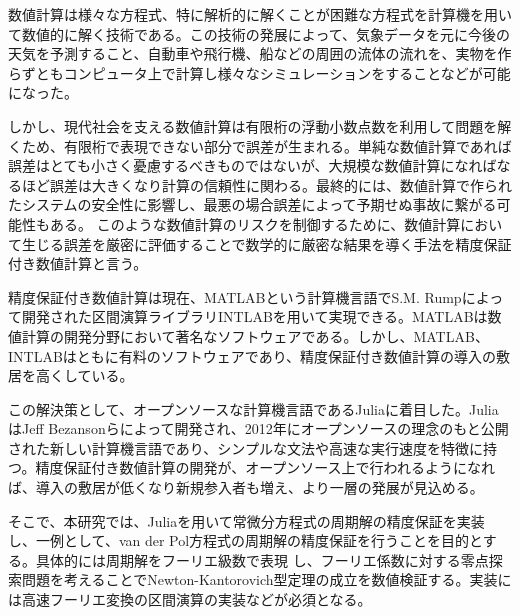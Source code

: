 %
数値計算は様々な方程式、特に解析的に解くことが困難な方程式を計算機を用いて数値的に解く技術である。この技術の発展によって、気象データを元に今後の天気を予測すること、自動車や飛行機、船などの周囲の流体の流れを、実物を作らずともコンピュータ上で計算し様々なシミュレーションをすることなどが可能になった。

しかし、現代社会を支える数値計算は有限桁の浮動小数点数を利用して問題を解くため、有限桁で表現できない部分で誤差が生まれる。単純な数値計算であれば誤差はとても小さく憂慮するべきものではないが、大規模な数値計算になればなるほど誤差は大きくなり計算の信頼性に関わる。最終的には、数値計算で作られたシステムの安全性に影響し、最悪の場合誤差によって予期せぬ事故に繋がる可能性もある。
このような数値計算のリスクを制御するために、数値計算において生じる誤差を厳密に評価することで数学的に厳密な結果を導く手法を精度保証付き数値計算と言う\cite{seidohoshou}。

精度保証付き数値計算は現在、MATLABという計算機言語でS.M. Rumpによって開発された区間演算ライブラリINTLABを用いて実現できる。MATLABは数値計算の開発分野において著名なソフトウェアである。しかし、MATLAB、INTLABはともに有料のソフトウェアであり、精度保証付き数値計算の導入の敷居を高くしている。

この解決策として、オープンソースな計算機言語であるJuliaに着目した。JuliaはJeff Bezansonらによって開発され、2012年にオープンソースの理念のもと公開された新しい計算機言語であり、シンプルな文法や高速な実行速度を特徴に持つ。精度保証付き数値計算の開発が、オープンソース上で行われるようになれば、導入の敷居が低くなり新規参入者も増え、より一層の発展が見込める。

そこで、本研究では、Juliaを用いて常微分方程式の周期解の精度保証を実装し、一例として、van der Pol方程式の周期解の精度保証を行うことを目的とする。具体的には周期解をフーリエ級数で表現\cite{FourierSpectol} し、フーリエ係数に対する零点探索問題を考えることでNewton-Kantorovich型定理の成立を数値検証\cite{radiipolynomial,JPLessard}する。実装には高速フーリエ変換の区間演算\cite{FFT}の実装などが必須となる。
%
